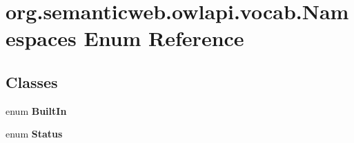 \hypertarget{enumorg_1_1semanticweb_1_1owlapi_1_1vocab_1_1_namespaces}{\section{org.\-semanticweb.\-owlapi.\-vocab.\-Namespaces Enum Reference}
\label{enumorg_1_1semanticweb_1_1owlapi_1_1vocab_1_1_namespaces}
}
\subsection*{Classes}
\begin{DoxyCompactItemize}
\item 
enum {\bfseries Built\-In}
\item 
enum {\bfseries Status}
\end{DoxyCompactItemize}
